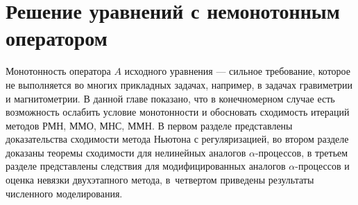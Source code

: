 \chapter{Решение уравнений с немонотонным оператором}
Монотонность оператора $A$ исходного уравнения --- сильное требование, которое не выполняется во многих прикладных задачах, например, в задачах гравиметрии и магнитометрии. В данной главе показано, что в конечномерном случае есть возможность ослабить условие монотонности и обосновать сходимость итераций методов РМН, ММО, МНС, ММН.
В первом разделе представлены доказательства сходимости метода Ньютона с регуляризацией, во втором разделе доказаны теоремы сходимости для нелинейных аналогов $\alpha$-процессов, в третьем разделе представлены следствия для модифицированных аналогов $\alpha$-процессов и оценка невязки двухэтапного метода, в~четвертом приведены результаты численного моделирования.

\newpage
